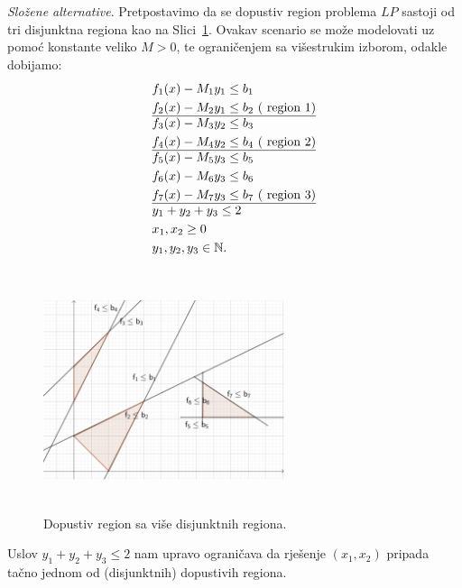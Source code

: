 \documentclass[a4paper, utf8, 11pt, colorlinks]{book}
\begin{document}
\emph{Složene alternative}. Pretpostavimo da se dopustiv region problema $LP$ sastoji od tri disjunktna regiona kao na Slici~\ref{fig:compound_regions}. Ovakav scenario se može modelovati uz pomoć konstante veliko $M>0$, te  ograničenjem sa višestrukim izborom, odakle dobijamo:
\begin{align*}
    &f_1(x) - M_1 y_1 \leq b_1 \\
    &f_2(x) - M_2 y_1 \leq b_2\ (\mbox{ region 1}) \\ \hline
    & f_3(x) - M_3 y_2 \leq b_3 \\ 
    & f_4(x) - M_4 y_2 \leq b_4\ (\mbox{ region 2})\\  \hline 
    & f_5(x) - M_5 y_3 \leq b_5 \\
    & f_6(x) - M_6 y_3 \leq b_6 \\
    & f_7(x) - M_7 y_3 \leq b_7\ (\mbox{ region 3}) \\ \hline
    & y_1 + y_2 + y_3 \leq 2 \\
    & x_1, x_2 \geq 0 \\
    & y_1, y_2, y_3 \in \mathbb{N}.
\end{align*}

\begin{figure}[!ht]
    \centering
    \includegraphics[width=200pt, height=200pt]{compound.eps}
    \caption{Dopustiv region sa više disjunktnih regiona.}
    \label{fig:compound_regions}
\end{figure}
Uslov $y_1 + y_2 + y_3 \leq 2$ nam upravo ograničava da rješenje $(x_1, x_2)$ pripada tačno jednom od (disjunktnih) dopustivih regiona. 
\end{document}

